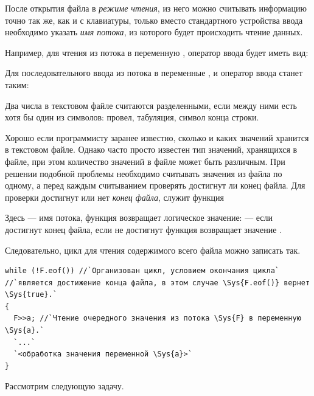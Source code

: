 После открытия файла в \emph{режиме чтения}, из него можно считывать информацию точно так же, как и с
клавиатуры, только вместо стандартного устройства ввода  необходимо указать
\emph{имя потока}, из которого будет происходить чтение данных.

Например, для чтения из потока  в переменную , оператор ввода будет иметь вид:


Для последовательного ввода из потока  в переменные ,  и
 оператор ввода станет таким:


Два числа в текстовом файле считаются разделенными, если между ними есть хотя бы один из символов: провел, табуляция,
символ конца строки.

Хорошо если программисту заранее известно, сколько и каких значений хранится в текстовом файле. Однако часто просто
известен тип значений, хранящихся в файле, при этом количество значений в файле может быть различным. При решении
подобной проблемы необходимо считывать значения из файла по одному, а перед каждым считыванием проверять достигнут ли
конец файла. Для проверки достигнут или нет \emph{конец файла}, служит функция 


Здесь  --- имя потока, функция возвращает логическое значение:  --- если
достигнут конец файла, если не достигнут функция возвращает значение .

Следовательно, цикл для чтения содержимого всего файла можно записать так.
\begin{lstlisting}
while (!F.eof()) //`Организован цикл, условием окончания цикла`
//`является достижение конца файла, в этом случае \Sys{F.eof()} вернет \Sys{true}.`
{
  F>>a;	//`Чтение очередного значения из потока \Sys{F} в переменную \Sys{a}.`
  `...`
  `<обработка значения переменной \Sys{a}>`
}
\end{lstlisting}

Рассмотрим следующую задачу.


